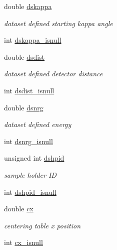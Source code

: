 \begin{DoxyCompactItemize}
\item 
double \hyperlink{structlspg__nextshot__struct_a59355281e8eb935cd7bfac597fdc5289}{dskappa}
\begin{DoxyCompactList}\small\item\em dataset defined starting kappa angle \item\end{DoxyCompactList}\item 
int \hyperlink{structlspg__nextshot__struct_a1686a72509cc1c3383ee95a790ddff14}{dskappa\_\-isnull}
\item 
double \hyperlink{structlspg__nextshot__struct_acab9431a911f5bb11296cbfb271fb83a}{dsdist}
\begin{DoxyCompactList}\small\item\em dataset defined detector distance \item\end{DoxyCompactList}\item 
int \hyperlink{structlspg__nextshot__struct_ac6f2bdc7b023d933509bf74af7b169f9}{dsdist\_\-isnull}
\item 
double \hyperlink{structlspg__nextshot__struct_a371e574055fec7660b8f2e637eaf9f25}{dsnrg}
\begin{DoxyCompactList}\small\item\em dataset defined energy \item\end{DoxyCompactList}\item 
int \hyperlink{structlspg__nextshot__struct_ad14d8bb50290ec12e58f4aaec5cc5aab}{dsnrg\_\-isnull}
\item 
unsigned int \hyperlink{structlspg__nextshot__struct_a5e260a420176f2973cdb100d0a5c4c09}{dshpid}
\begin{DoxyCompactList}\small\item\em sample holder ID \item\end{DoxyCompactList}\item 
int \hyperlink{structlspg__nextshot__struct_afe16be0382423aa3f25cb3d6cf99430b}{dshpid\_\-isnull}
\item 
double \hyperlink{structlspg__nextshot__struct_ad9eb2013fa6f295f72f0891fe98c863f}{cx}
\begin{DoxyCompactList}\small\item\em centering table x position \item\end{DoxyCompactList}\item 
int \hyperlink{structlspg__nextshot__struct_a779b99533f0ed4e659177afb0b791ad2}{cx\_\-isnull}

\end{DoxyCompactItemize}
